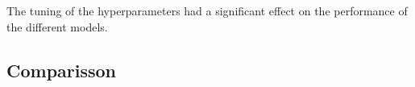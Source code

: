 The tuning of the hyperparameters had a significant effect on the performance of the different models.




\subsection[]{Comparisson}
\label{ch:Experiment-2}







